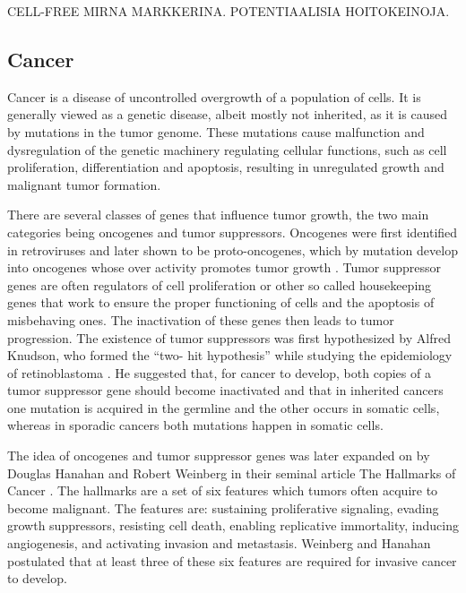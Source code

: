 CELL-FREE MIRNA MARKKERINA. POTENTIAALISIA HOITOKEINOJA.










\subsection{Cancer}\label{cancer}

Cancer is a disease of uncontrolled overgrowth of a population of cells. It is
generally viewed as a genetic disease, albeit mostly not inherited, as it is
caused by  mutations in the tumor genome. These mutations cause malfunction
and dysregulation of the genetic machinery regulating cellular functions, such
as cell proliferation, differentiation and apoptosis, resulting in
unregulated growth and malignant tumor formation.

There are several classes of genes that influence tumor growth, the two main
categories being oncogenes and tumor suppressors. Oncogenes were first
identified in retroviruses and later shown to be proto-oncogenes, which by
mutation develop into oncogenes whose over activity promotes tumor growth
\citep{Varmus1988}. Tumor suppressor genes are often regulators of cell
proliferation or other so called housekeeping genes that work to ensure the
proper functioning of cells and the apoptosis of misbehaving ones. The
inactivation of these genes then leads to tumor progression. The existence of
tumor suppressors was first hypothesized by Alfred Knudson, who formed the “two-
hit hypothesis” while studying the epidemiology of retinoblastoma
\citep{Knudson1971}. He suggested that, for cancer to develop, both copies of
a tumor suppressor gene should become inactivated and that in inherited
cancers one mutation is acquired in the germline and the other occurs in
somatic cells, whereas in sporadic cancers both mutations happen in somatic
cells.

The idea of oncogenes and tumor suppressor genes was later expanded on by
Douglas Hanahan and Robert Weinberg in their seminal article The Hallmarks of
Cancer \citep{Hanahan2000}. The hallmarks are a set of six features which
tumors often acquire to become malignant. The features are: sustaining
proliferative signaling, evading growth suppressors, resisting cell death,
enabling replicative immortality, inducing angiogenesis, and activating
invasion and metastasis. Weinberg and Hanahan postulated that at least three
of these six features are required for invasive cancer to develop.

